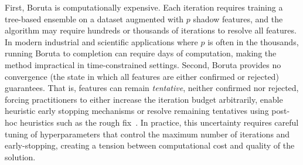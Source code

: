 \documentclass[runningheads]{llncs}
\begin{document}
First, Boruta is computationally expensive. Each iteration requires training a tree-based ensemble on a dataset augmented with $p$ shadow features, and the algorithm may require hundreds or thousands of iterations to resolve all features. In modern industrial and scientific applications where $p$ is often in the thousands, running Boruta to completion can require days of computation, making the method impractical in time-constrained settings. Second, Boruta provides no convergence (the state in which all features are either confirmed or rejected) guarantees. That is, features can remain \emph{tentative}, neither confirmed nor rejected, forcing practitioners to either increase the iteration budget arbitrarily, enable heuristic early stopping mechanisms or resolve remaining tentatives using post-hoc heuristics such as the rough fix~\cite{kursa2010feature}. In practice, this uncertainty requires careful tuning of hyperparameters that control the maximum number of iterations and early-stopping, creating a tension between computational cost and quality of the solution.

\end{document}
